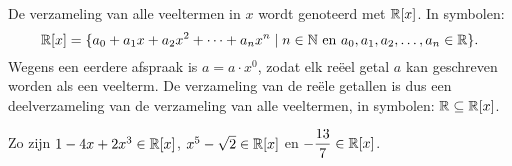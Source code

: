 \documentclass{ximera}
\begin{document}
\begin{notation}

    De verzameling van alle veeltermen in $x$ wordt genoteerd met $\mathbb{R}[x]$. In symbolen:
    \[
    \mathbb{R}[x] = \{a_0 + a_1 x + a_2 x^2 + \dots + a_n x^n \mid \text{$n \in \mathbb{N}$ en $a_0,a_1,a_2,\ldots,a_n \in \mathbb{R}$} \}.
    \]
    Wegens een eerdere afspraak is $a = a\cdot x^0$, zodat elk reëel getal $a$ kan geschreven worden als een veelterm. De verzameling van de reële getallen is dus een deelverzameling
    van de verzameling van alle veeltermen, in symbolen: $\mathbb{R} \subseteq \mathbb{R}[x]$.
    
    
    \begin{example} 
       Zo zijn $1-4x+2x^3 \in \mathbb{R}[x]$, $x^5-\sqrt{2} \in \mathbb{R}[x]$ en $\displaystyle -\frac{13}{7} \in \mathbb{R}[x]$.   
    \end{example} 
    
\end{notation}




\renewcommand{\TJa}{\makebox[2.5cm]{een veelterm }}
\renewcommand{\TNee}{\makebox[2.5cm]{eeen veelterm}}
  
\end{document}
